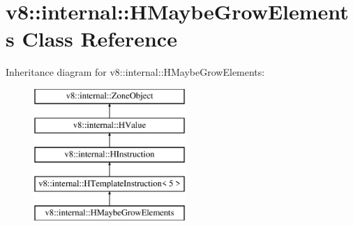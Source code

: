 \hypertarget{classv8_1_1internal_1_1_h_maybe_grow_elements}{}\section{v8\+:\+:internal\+:\+:H\+Maybe\+Grow\+Elements Class Reference}
\label{classv8_1_1internal_1_1_h_maybe_grow_elements}
Inheritance diagram for v8\+:\+:internal\+:\+:H\+Maybe\+Grow\+Elements\+:\begin{figure}[H]
\begin{center}
\leavevmode
\includegraphics[height=5.000000cm]{classv8_1_1internal_1_1_h_maybe_grow_elements}
\end{center}
\end{figure}
